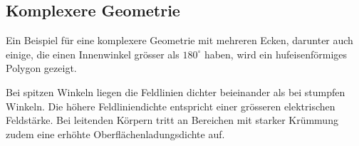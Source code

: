 \subsection{Komplexere Geometrie}
Ein Beispiel für eine komplexere Geometrie mit mehreren Ecken, darunter auch einige, die einen Innenwinkel grösser als $180^{\circ}$ haben, wird ein hufeisenförmiges Polygon gezeigt.
%

Bei spitzen Winkeln liegen die Feldlinien dichter beieinander als bei stumpfen Winkeln.
Die höhere Feldliniendichte entspricht einer grösseren elektrischen Feldstärke.
Bei leitenden Körpern tritt an Bereichen mit starker Krümmung zudem eine erhöhte Oberflächenladungsdichte auf.


